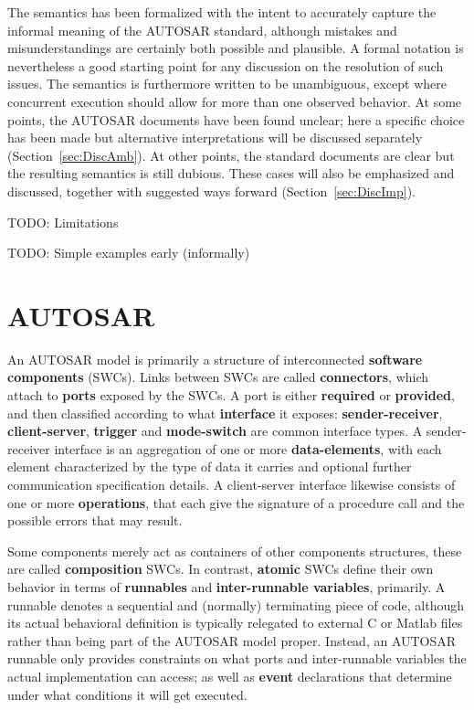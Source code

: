 \documentclass[twocolumn]{article}
\begin{document}
The semantics has been formalized with the intent to accurately capture the informal meaning of the AUTOSAR standard, although mistakes and misunderstandings are certainly both possible and plausible. A formal notation is nevertheless a good starting point for any discussion on the resolution of such issues. The semantics is furthermore written to be unambiguous, except where concurrent execution should allow for more than one observed behavior. At some points, the AUTOSAR documents have been found unclear; here a specific choice has been made but alternative interpretations will be discussed separately (Section~\ref{sec:DiscAmb}). At other points, the standard documents are clear but the resulting semantics is still dubious. These cases will also be emphasized and discussed, together with suggested ways forward (Section~\ref{sec:DiscImp}).


TODO: Limitations

TODO: Simple examples early (informally)

\section{AUTOSAR}
\label{sec:autosar}

An AUTOSAR model is primarily a structure of interconnected {\bf software components} (SWCs). Links between SWCs are called {\bf connectors}, which attach to {\bf ports} exposed by the SWCs. A port is either {\bf required} or {\bf provided}, and then classified according to what {\bf interface} it exposes: {\bf sender-receiver}, {\bf client-server}, {\bf trigger} and {\bf mode-switch} are common interface types. A sender-receiver interface is an aggregation of one or more {\bf data-elements}, with each element characterized by the type of data it carries and optional further communication specification details. A client-server interface likewise consists of one or more {\bf operations}, that each give the signature of a procedure call and the possible errors that may result.

Some components merely act as containers of other components structures, these are called {\bf composition} SWCs. In contrast, {\bf atomic} SWCs define their own behavior in terms of {\bf runnables} and {\bf inter-runnable variables}, primarily. A runnable denotes a sequential and (normally) terminating piece of code, although its actual behavioral definition is typically relegated to external C or Matlab files rather than being part of the AUTOSAR model proper. Instead, an AUTOSAR runnable  only provides constraints on what ports and inter-runnable variables the actual implementation can access; as well as {\bf event} declarations that determine under what conditions it will get executed.
\end{document}

